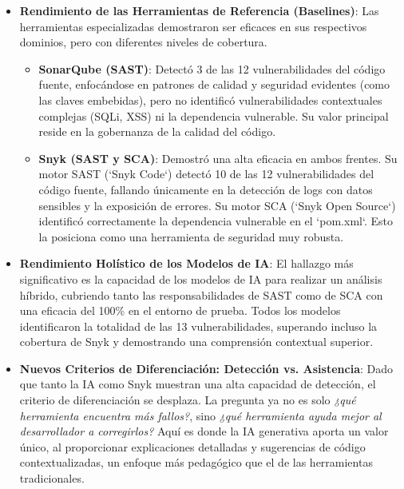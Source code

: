 \begin{itemize}
    \item \textbf{Rendimiento de las Herramientas de Referencia (Baselines)}: Las herramientas especializadas demostraron ser eficaces en sus respectivos dominios, pero con diferentes niveles de cobertura.
        \begin{itemize}
            \item \textbf{SonarQube (SAST)}: Detectó 3 de las 12 vulnerabilidades del código fuente, enfocándose en patrones de calidad y seguridad evidentes (como las claves embebidas), pero no identificó vulnerabilidades contextuales complejas (SQLi, XSS) ni la dependencia vulnerable. Su valor principal reside en la gobernanza de la calidad del código.
            \item \textbf{Snyk (SAST y SCA)}: Demostró una alta eficacia en ambos frentes. Su motor SAST (`Snyk Code`) detectó 10 de las 12 vulnerabilidades del código fuente, fallando únicamente en la detección de logs con datos sensibles y la exposición de errores. Su motor SCA (`Snyk Open Source`) identificó correctamente la dependencia vulnerable en el `pom.xml`. Esto la posiciona como una herramienta de seguridad muy robusta.
        \end{itemize}

    \item \textbf{Rendimiento Holístico de los Modelos de IA}: El hallazgo más significativo es la capacidad de los modelos de IA para realizar un análisis híbrido, cubriendo tanto las responsabilidades de SAST como de SCA con una eficacia del 100\% en el entorno de prueba. Todos los modelos identificaron la totalidad de las 13 vulnerabilidades, superando incluso la cobertura de Snyk y demostrando una comprensión contextual superior.

    \item \textbf{Nuevos Criterios de Diferenciación: Detección vs. Asistencia}: Dado que tanto la IA como Snyk muestran una alta capacidad de detección, el criterio de diferenciación se desplaza. La pregunta ya no es solo \textit{¿qué herramienta encuentra más fallos?}, sino \textit{¿qué herramienta ayuda mejor al desarrollador a corregirlos?} Aquí es donde la IA generativa aporta un valor único, al proporcionar explicaciones detalladas y sugerencias de código contextualizadas, un enfoque más pedagógico que el de las herramientas tradicionales.


\end{itemize}
